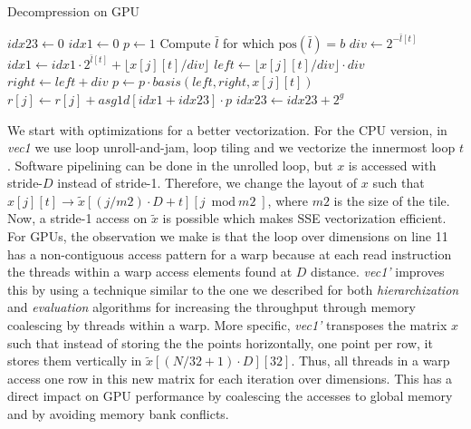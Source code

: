 \begin{algorithm}[t]
\small{
	\caption{Decompression on GPU}
	\label{alg:evaluation}
	\begin{algorithmic}[1]
    		    \State $\textit{idx23} \leftarrow 0$
						\State $\textit{idx1} \leftarrow 0$
						\State $\textit{p} \leftarrow 1$
							\State Compute $\bar{l}$ for which $\text{pos}(\bar{l}) = b$
						\EndIf
							\State $div \leftarrow 2^{-\bar{l}[t]}$
							\State $\textit{idx1} \leftarrow \textit{idx1} \cdot 2^{\bar{l}[t]} + \lfloor	x[j][t] / div \rfloor$
							\State $left \leftarrow \lfloor x[j][t] / div \rfloor \cdot div$
							\State $right \leftarrow left + div$
							\State $p \leftarrow p \cdot basis(left, right, x[j][t])$
						\EndFor
						\State $r[j] \leftarrow r[j] + \textit{asg1d}[\textit{idx1}	+\textit{idx23}] \cdot p$ 
						\State $\textit{idx23} \leftarrow \textit{idx23} + 2^g$
					\EndFor
				\EndFor
    		\EndFor
    	\EndProcedure
 	\end{algorithmic}
}
\end{algorithm}

We start with optimizations for a better vectorization. For the CPU version,
in \textit{vec1} we use loop unroll-and-jam, loop tiling and we vectorize the
innermost loop $t$. Software pipelining can be done in the unrolled loop, but
$x$ is accessed with stride-$D$ instead of stride-1. Therefore, we change the
layout of $x$ such that $x[j][t] \rightarrow \tilde{x}[(j/\textit{m2}) \cdot D +
t][j \bmod \textit{m2}]$, where $\textit{m2}$ is the size of the tile. Now, a
stride-1 access on $\tilde{x}$ is possible which makes SSE vectorization
efficient. For GPUs, the observation we make is that the loop over dimensions on
line 11 has a non-contiguous access pattern for a warp because at each read
instruction the threads within a warp access elements found at $D$ distance.
\textit{vec1'} improves this by using a technique similar to the one we
described for both \textit{hierarchization} and \textit{evaluation} algorithms
for increasing the throughput through memory coalescing by threads within a
warp. More specific, \textit{vec1'} transposes the matrix $x$ such that instead
of storing the the points horizontally, one point per row, it stores them
vertically in $\tilde{x}[(N/32+1) \cdot D][32]$. Thus, all threads in a warp
access one row in this new matrix for each iteration over dimensions. This has a
direct impact on GPU performance by coalescing the accesses to global memory and
by avoiding memory bank conflicts.

